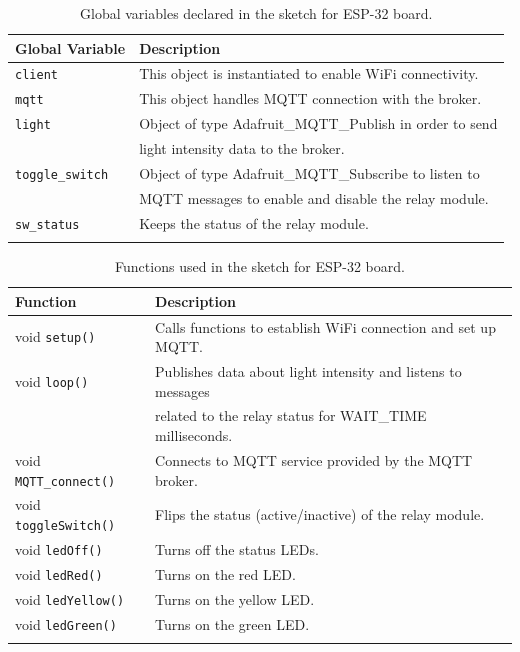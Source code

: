 \noindent\begin{minipage}{\textwidth}
	\begingroup
	\setlength{\LTleft}{-20cm plus -1fill}
	\setlength{\LTright}{\LTleft}
	\begin{longtable}{l | l}
		\hline
		\textbf{Global Variable} & \textbf{Description} \\
		\hline
		\hline
		\texttt{client} & This object is instantiated to enable WiFi connectivity. \\
		\hline
		\texttt{mqtt} & This object handles MQTT connection with the broker. \\
		\hline
		\texttt{light} & Object of type Adafruit\_MQTT\_Publish in order to send \\
					   & light intensity data to the broker. \\
		\hline
		\texttt{toggle\_switch} & Object of type Adafruit\_MQTT\_Subscribe to listen to \\
								& MQTT messages to enable and disable the relay module. \\
		\hline
		\texttt{sw\_status} & Keeps the status of the relay module. \\
		\hline
		
		\caption{Global variables declared in the sketch for ESP-32 board.}
		\label{esp32_global_variables}
	\end{longtable}
	\endgroup
\end{minipage}

\noindent\begin{minipage}{\textwidth}
	\begingroup
	\setlength{\LTleft}{-20cm plus -1fill}
	\setlength{\LTright}{\LTleft}
	\begin{longtable}{l | l}
		\hline
		\textbf{Function} & \textbf{Description} \\
		\hline
		\hline
		void \texttt{setup()} & Calls functions to establish WiFi connection and set up MQTT. \\
		\hline
		void \texttt{loop()} & Publishes data about light intensity and listens to messages \\
							 & related to the relay status for WAIT\_TIME milliseconds. \\
		\hline
		void \texttt{MQTT\_connect()} & Connects to MQTT service provided by the MQTT broker. \\
		\hline
		void \texttt{toggleSwitch()} & Flips the status (active/inactive) of the relay module. \\
		\hline
		void \texttt{ledOff()} & Turns off the status LEDs.\\
		void \texttt{ledRed()} & Turns on the red LED.\\
		void \texttt{ledYellow()} & Turns on the yellow LED.\\
		void \texttt{ledGreen()} & Turns on the green LED.\\
		\hline
		
		\caption{Functions used in the sketch for ESP-32 board.}
		\label{esp32_functions}
	\end{longtable}
	\endgroup
\end{minipage}